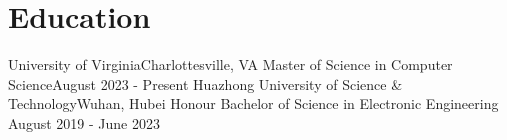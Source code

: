 \section{Education}
  \resumeSubHeadingListStart
    
    \resumeSubheading
      {University of Virginia}{Charlottesville, VA}
      {Master of Science in Computer Science}{August 2023 - Present}
        \resumeItemListStart
        \resumeItemListEnd
    \resumeSubheading
      {Huazhong University of Science \& Technology}{Wuhan, Hubei}
      {Honour Bachelor of Science in Electronic Engineering }{August 2019 - June 2023}
        \resumeItemListStart
        \resumeItemListEnd
  \resumeSubHeadingListEnd